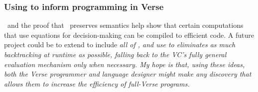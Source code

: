 \documentclass[manuscript,screen,review, 12pt, nonacm]{acmart}
\begin{document}
        \subsubsection{Using \VMinus to inform programming in Verse}
        \label{vminusandvc}
        
        
        

        
        \DTran\ and the proof that \DTran\ preserves semantics help show that
        certain computations that use equations for decision-making can be
        compiled to efficient code. A future project could be to extend \VMinus
        to include \it{all} of \VC, and use \DTran to eliminates as much
        backtracking at runtime as possible, falling back to the VC's fully
        general evaluation mechanism only when necessary. My hope is that, using
        these ideas, both the Verse programmer and language designer might make
        any discovery that allows them to increase the efficiency of full-Verse
        programs. 
\end{document}
